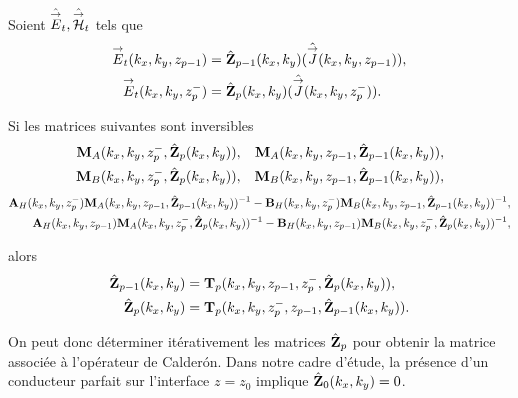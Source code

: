     \begin{prop}%
      \label{prop:plan:synthese:impedance}{}~

      Soient \(\hat{{\overset{\rightarrow}{E}}}_t,\hat{{\overset{\rightarrow}{\mathcal{H}}}}_t\) tels que 
      \begin{align*}
      {\overset{\rightarrow}{E}}_t(k_x,k_y,z_{p-1}) &= \hat{\mathbf{Z}}_{p-1}(k_x,k_y)(\hat{{\overset{\rightarrow}{J}}}(k_x,k_y,z_{p-1})),
      \\
      {\overset{\rightarrow}{E}}_t(k_x,k_y,z_p^-) &= \hat{\mathbf{Z}}_{p}(k_x,k_y)(\hat{{\overset{\rightarrow}{J}}}(k_x,k_y,z_p^-)).
      \end{align*}

      Si les matrices suivantes sont inversibles
      \begin{align*}
        \mathbf{M}_{A}(k_x,k_y,z_p^-,\hat{\mathbf{Z}}_{p}(k_x,k_y)), && \mathbf{M}_{A}(k_x,k_y,z_{p-1},\hat{\mathbf{Z}}_{p-1}(k_x,k_y)),
        \\
        \mathbf{M}_{B}(k_x,k_y,z_p^-,\hat{\mathbf{Z}}_{p}(k_x,k_y)), && \mathbf{M}_{B}(k_x,k_y,z_{p-1},\hat{\mathbf{Z}}_{p-1}(k_x,k_y)),
      \end{align*}
      \begin{align*}
        \mathbf{A}_{H}(k_x,k_y,z_p^-)\mathbf{M}_{A}(k_x,k_y,z_{p-1},\hat{\mathbf{Z}}_{p-1}(k_x,k_y))^{-1} - \mathbf{B}_{H}(k_x,k_y,z_p^-)\mathbf{M}_{B}(k_x,k_y,z_{p-1},\hat{\mathbf{Z}}_{p-1}(k_x,k_y))^{-1},
        \\
        \mathbf{A}_{H}(k_x,k_y,z_{p-1})\mathbf{M}_{A}(k_x,k_y,z_p^-,\hat{\mathbf{Z}}_{p}(k_x,k_y))^{-1} - \mathbf{B}_{H}(k_x,k_y,z_{p-1})\mathbf{M}_{B}(k_x,k_y,z_p^-,\hat{\mathbf{Z}}_{p}(k_x,k_y))^{-1},
      \end{align*}

      alors 
      \begin{align*}
        \hat{\mathbf{Z}}_{p-1}(k_x,k_y) &= \mathbf{T}_p(k_x,k_y,z_{p-1},z_p^-,\hat{\mathbf{Z}}_{p}(k_x,k_y)),
        \\
        \hat{\mathbf{Z}}_{p}(k_x,k_y) &= \mathbf{T}_p(k_x,k_y,z_p^-,z_{p-1},\hat{\mathbf{Z}}_{p-1}(k_x,k_y)).
      \end{align*}

    \end{prop}

    On peut donc déterminer itérativement les matrices \(\hat{\mathbf{Z}}_{p}\) pour obtenir la matrice associée à l'opérateur de Calderón.
    Dans notre cadre d'étude, la présence d'un conducteur parfait sur l'interface \(z= z_0\) implique \(\hat{\mathbf{Z}}_{0}(k_x,k_y) = 0\).


